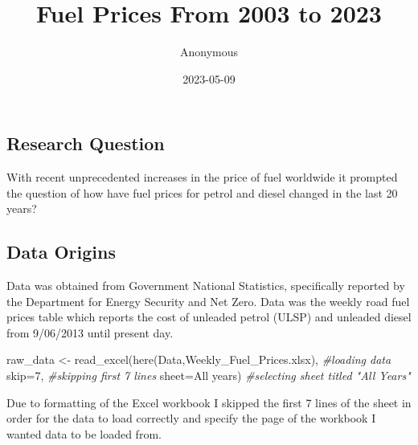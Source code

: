 \documentclass[
]{article}
\title{Fuel Prices From 2003 to 2023}
\author{Anonymous}
\date{2023-05-09}
\newenvironment{Shaded}{\begin{snugshade}}{\end{snugshade}}
\newcommand{\AttributeTok}[1]{\textcolor[rgb]{0.77,0.63,0.00}{#1}}
\newcommand{\CommentTok}[1]{\textcolor[rgb]{0.56,0.35,0.01}{\textit{#1}}}
\newcommand{\DecValTok}[1]{\textcolor[rgb]{0.00,0.00,0.81}{#1}}
\newcommand{\FunctionTok}[1]{\textcolor[rgb]{0.00,0.00,0.00}{#1}}
\newcommand{\NormalTok}[1]{#1}
\newcommand{\OtherTok}[1]{\textcolor[rgb]{0.56,0.35,0.01}{#1}}
\newcommand{\StringTok}[1]{\textcolor[rgb]{0.31,0.60,0.02}{#1}}
\begin{document}
\maketitle

\hypertarget{research-question}{%
\subsection{Research Question}\label{research-question}}

With recent unprecedented increases in the price of fuel worldwide it
prompted the question of how have fuel prices for petrol and diesel
changed in the last 20 years?

\hypertarget{data-origins}{%
\subsection{Data Origins}\label{data-origins}}

Data was obtained from Government National Statistics, specifically
reported by the Department for Energy Security and Net Zero. Data was
the weekly road fuel prices table which reports the cost of unleaded
petrol (ULSP) and unleaded diesel from 9/06/2013 until present day.

\begin{Shaded}
\begin{Highlighting}[]
\NormalTok{raw\_data }\OtherTok{\textless{}{-}} \FunctionTok{read\_excel}\NormalTok{(}\FunctionTok{here}\NormalTok{(}\StringTok{\textquotesingle{}Data\textquotesingle{}}\NormalTok{,}\StringTok{\textquotesingle{}Weekly\_Fuel\_Prices.xlsx\textquotesingle{}}\NormalTok{), }\CommentTok{\#loading data}
                       \AttributeTok{skip=}\DecValTok{7}\NormalTok{, }\CommentTok{\#skipping first 7 lines}
                       \AttributeTok{sheet=}\StringTok{\textquotesingle{}All years\textquotesingle{}}\NormalTok{) }\CommentTok{\#selecting sheet titled "All Years"}
\end{Highlighting}
\end{Shaded}

Due to formatting of the Excel workbook I skipped the first 7 lines of
the sheet in order for the data to load correctly and specify the page
of the workbook I wanted data to be loaded from.
\end{document}
